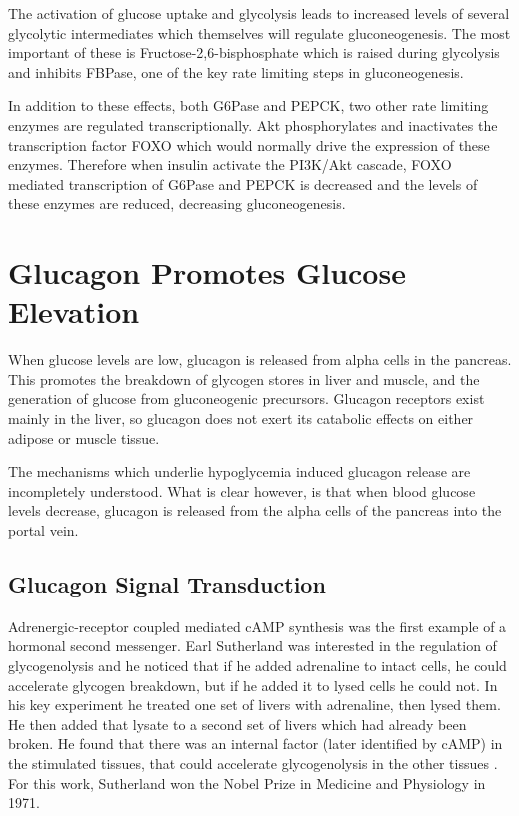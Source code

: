 \documentclass{tufte-handout}
\begin{document}
The activation of glucose uptake and glycolysis leads to increased levels of several glycolytic intermediates which themselves will regulate gluconeogenesis.  The most important of these is Fructose-2,6-bisphosphate which is raised during glycolysis and inhibits FBPase, one of the key rate limiting steps in gluconeogenesis.

In addition to these effects, both G6Pase and PEPCK, two other rate limiting enzymes are regulated transcriptionally.  Akt phosphorylates and inactivates the transcription factor FOXO which would normally drive the expression of these enzymes.  Therefore when insulin activate the PI3K/Akt cascade, FOXO mediated transcription of G6Pase and PEPCK is decreased and the levels of these enzymes are reduced, decreasing gluconeogenesis.

\section{Glucagon Promotes Glucose Elevation}

 When glucose levels are low, glucagon is released from alpha cells in the pancreas.  This promotes the breakdown of glycogen stores in liver and muscle, and the generation of glucose from gluconeogenic precursors.  Glucagon receptors exist mainly in the liver, so glucagon does not exert its catabolic effects on either adipose or muscle tissue. 

The mechanisms which underlie hypoglycemia induced glucagon release are incompletely understood.  What is clear however, is that when blood glucose levels decrease, glucagon is released from the alpha cells of the pancreas into the portal vein.

\subsection{Glucagon Signal Transduction}

Adrenergic-receptor coupled mediated cAMP synthesis was the first example of a hormonal second messenger.  Earl Sutherland was interested in the regulation of glycogenolysis and he noticed that if he added adrenaline to intact cells, he could accelerate glycogen breakdown, but if he added it to lysed cells he could not.  In his key experiment he treated one set of livers with adrenaline, then lysed them.  He then added that lysate to a second set of livers which had already been broken.  He found that there was an internal factor (later identified by cAMP) in the stimulated tissues, that could accelerate glycogenolysis in the other tissues \cite{Rall1956}.  For this work, Sutherland won the Nobel Prize in Medicine and Physiology in 1971.
\end{document}
